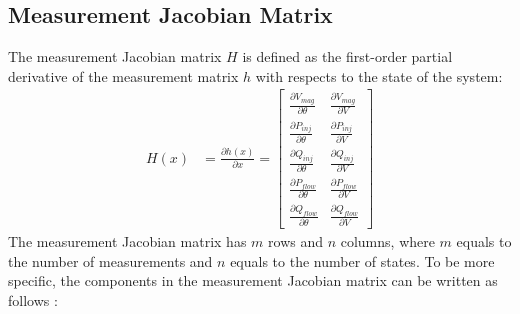 \subsection{Measurement Jacobian Matrix} \label{jacobian_matrix}
The measurement Jacobian matrix $H$ is defined as the first-order partial derivative of the measurement matrix $h$ with respects to the state of the system: 
\bigskip
\begin{align} 
    H(x) &= \frac{\partial h(x)}{\partial x} 
    =      
    \begin{bmatrix}
                \frac{\partial V_{mag}}{\partial \theta} & \frac{\partial V_{mag}}{\partial V} \\[6pt]
                \frac{\partial P_{inj}}{\partial \theta} & \frac{\partial P_{inj}}{\partial V} \\[6pt]
                \frac{\partial Q_{inj}}{\partial \theta} & \frac{\partial Q_{inj}}{\partial V} \\[6pt]
                \frac{\partial P_{flow}}{\partial \theta} & \frac{\partial P_{flow}}{\partial V} \\[6pt]        \frac{\partial Q_{flow}}{\partial \theta} & \frac{\partial Q_{flow}}{\partial V}             
            \end{bmatrix}
    \label{eq:jacobian_matrix} 
\end{align}
The measurement Jacobian matrix has $m$ rows and $n$ columns, where $m$ equals to the number of measurements and $n$ equals to the number of states. To be more specific, the components in the measurement Jacobian matrix can be written as follows \cite{jaman2017implementation}:
